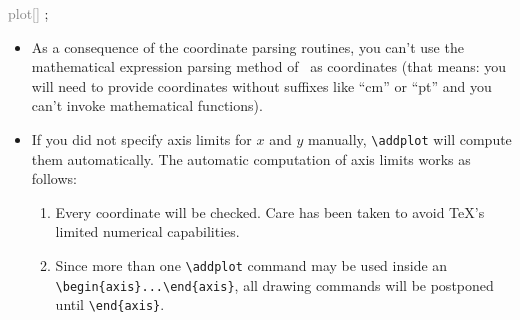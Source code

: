 \begin{command}{ \textcolor{gray}{plot[]}  ;}
\begin{itemize}
	\item As a consequence of the coordinate parsing routines, you can't use the mathematical expression parsing method of \PGF\ as coordinates (that means: you will need to provide coordinates without suffixes like ``cm'' or ``pt'' and you can't invoke mathematical functions).
	
	\item If you did not specify axis limits for $x$ and $y$ manually, \lstinline!\addplot! will compute them automatically. 
	The automatic computation of axis limits works as follows:
		\begin{enumerate}
			\item Every coordinate will be checked. Care has been taken to avoid \TeX's limited numerical capabilities.
			\item Since more than one \lstinline!\addplot! command may be used inside an \lstinline!\begin{axis}...\end{axis}!, all drawing commands will be postponed until \lstinline!\end{axis}!.
		\end{enumerate}
\end{itemize}
\end{command}

